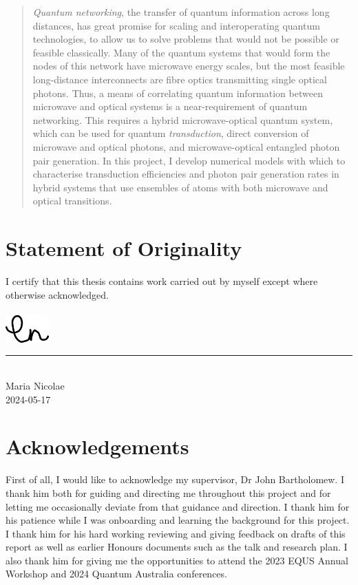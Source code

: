 \begin{abstract}
\textit{Quantum networking}, the transfer of quantum information across long distances, has great promise for scaling and interoperating quantum technologies, to allow us to solve problems that would not be possible or feasible classically. Many of the quantum systems that would form the nodes of this network have microwave energy scales, but the most feasible long-distance interconnects are fibre optics transmitting single optical photons. Thus, a means of correlating quantum information between microwave and optical systems is a near-requirement of quantum networking. This requires a hybrid microwave-optical quantum system, which can be used for quantum \textit{transduction}, direct conversion of microwave and optical photons, and microwave-optical entangled photon pair generation. In this project, I develop numerical models with which to characterise transduction efficiencies and photon pair generation rates in hybrid systems that use ensembles of atoms with both microwave and optical transitions.
\end{abstract}

\section*{Statement of Originality}
I certify that this thesis contains work carried out by myself except where otherwise acknowledged.\\
\vspace{1em}\\
\includegraphics[height=30pt]{signature}
\vspace*{-1em}\\
\rule{3cm}{0.5pt}\\
Maria Nicolae\\
2024-05-17

\section*{Acknowledgements}
First of all, I would like to acknowledge my supervisor, Dr John Bartholomew. I thank him both for guiding and directing me throughout this project and for letting me occasionally deviate from that guidance and direction. I thank him for his patience while I was onboarding and learning the background for this project. I thank him for his hard working reviewing and giving feedback on drafts of this report as well as earlier Honours documents such as the talk and research plan. I also thank him for giving me the opportunities to attend the 2023 EQUS Annual Workshop and 2024 Quantum Australia conferences. 

